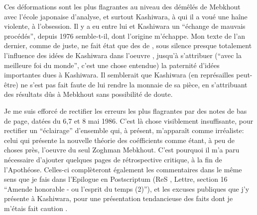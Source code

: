  Ces déformations sont les plus flagrantes au niveau des démêlés de Mebkhout avec l'école japonaise d'analyse, et surtout   Kashiwara, à qui il a voué une haîne violente,   à l'obsession. Il y\deleted{\unsure{,}} a eu entre lui et Kashiwara un ``échange de mauvais procédés'', depuis 1976 semble-t-il, dont l'origine m'échappe. Mon texte de l'an dernier, comme de juste, ne fait état que des   de ,   sous silence presque totalement l'influence des idées de Kashiwara dans  l'oeuvre ,   jusqu'à s'attribuer (``avec la meilleure foi du monde'', c'est une chose entendue) la paternité d'idées importantes dues à Kashiwara. Il semblerait que Kashiwara (en représailles peut-être) ne s'est pas fait faute de lui rendre la monnaie de sa pièce, en s'attribuant  des résultats  dûs à Mebkhout sans possibilité de doute.

Je me suis efforcé de rectifier les erreurs les plus flagrantes par des notes de bas de page\handwritten{\inserted{(*)}}, datées du 6,7 et 8 mai 1986. C'est là chose visiblement insuffisante, pour rectifier un ``éclairage'' d'ensemble qui, à présent, m'apparaît comme irréaliste: celui qui présente la nouvelle théorie des coéfficients comme étant, à peu de choses près, l'oeuvre  du seul Zoghman Mebkhout. C'est pourquoi il m'a paru nécessaire d'ajouter  quelques pages de rétrospective critique, à la fin de l'Apothéose. Celles-ci complèteront également les commentaires dans le même sens que je fais dans l'Epilogue en Postscriptum (ReS  , Lettre,  section 16 ``Amende honorable - ou l'esprit du temps (2)''), et les excuses publiques que j'y présente à Kashiwara, pour une présentation tendancieuse des faits\handwritten{,} dont je m'étais fait caution .


